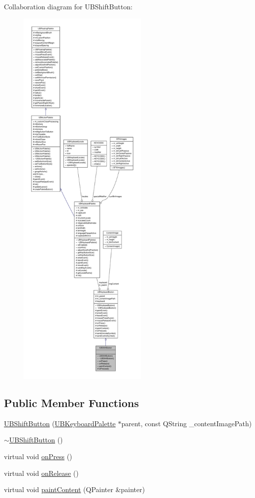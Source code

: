 Collaboration diagram for U\-B\-Shift\-Button\-:
\nopagebreak
\begin{figure}[H]
\begin{center}
\leavevmode
\includegraphics[height=550pt]{da/d62/class_u_b_shift_button__coll__graph}
\end{center}
\end{figure}
\subsection*{Public Member Functions}
\begin{DoxyCompactItemize}
\item 
\hyperlink{class_u_b_shift_button_ac6d434f57fe1af21420bc57189b10c5d}{U\-B\-Shift\-Button} (\hyperlink{class_u_b_keyboard_palette}{U\-B\-Keyboard\-Palette} $\ast$parent, const Q\-String \-\_\-content\-Image\-Path)
\item 
\hyperlink{class_u_b_shift_button_aa0f23402ec5d2dc07d9468caae2c8a03}{$\sim$\-U\-B\-Shift\-Button} ()
\item 
virtual void \hyperlink{class_u_b_shift_button_acd1f903c7836995f3240c7bc0c0f2cc4}{on\-Press} ()
\item 
virtual void \hyperlink{class_u_b_shift_button_a24e0089f095dacc79302efff87c05ce8}{on\-Release} ()
\item 
virtual void \hyperlink{class_u_b_shift_button_acda4d2c01e2c5c6e1863973036985d85}{paint\-Content} (Q\-Painter \&painter)
\end{DoxyCompactItemize}
